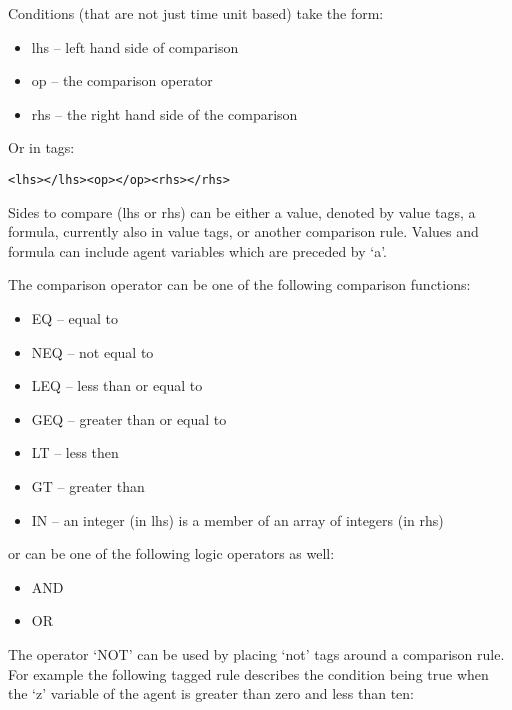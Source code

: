 Conditions (that are not just time unit based) take the form:

\begin{itemize}
  \item lhs -- left hand side of comparison
  \item op -- the comparison operator
  \item rhs -- the right hand side of the comparison
\end{itemize}

Or in tags:

\begin{mylisting}
\begin{verbatim}
<lhs></lhs><op></op><rhs></rhs>
\end{verbatim}
\end{mylisting}

Sides to compare (lhs or rhs) can be either a value, denoted by value tags,
a formula, currently also in value tags, or another comparison rule.
Values and formula can include agent variables which are preceded by `a'.


The comparison operator can be one of the following comparison functions:

\begin{itemize}
\item EQ -- equal to
\item NEQ -- not equal to
\item LEQ -- less than or equal to
\item GEQ -- greater than or equal to
\item LT -- less then
\item GT -- greater than
\item IN -- an integer (in lhs) is a member of an array of integers (in rhs)
\end{itemize}

or can be one of the following logic operators as well:

\begin{itemize}
\item AND
\item OR
\end{itemize}

The operator `NOT' can be used by placing `not' tags around a comparison rule.
For example the following tagged rule describes the condition being true when
the `z' variable of the agent is greater than zero and less than ten:

